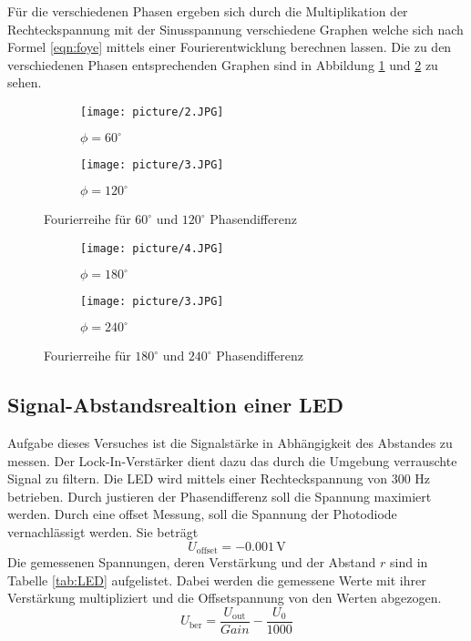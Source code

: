 Für die verschiedenen Phasen ergeben sich durch die Multiplikation der Rechteckspannung mit der Sinusspannung verschiedene Graphen welche sich nach Formel \ref{eqn:foye} mittels einer Fourierentwicklung berechnen lassen. Die zu den verschiedenen Phasen entsprechenden Graphen sind in Abbildung \ref{fig:graph1} und \ref{fig:graph2} zu sehen.

\begin{figure}
  \centering
  \begin{subfigure}{0.48\textwidth}
    \centering
    \texttt{[image: picture/2.JPG]}
    \caption{$\phi = 60^{\circ}$}
  \end{subfigure}
  \begin{subfigure}{0.48\textwidth}
    \centering
    \texttt{[image: picture/3.JPG]}
    \caption{$\phi = 120^{\circ}$}
  \end{subfigure}
  \caption{Fourierreihe für $60^{\circ}$ und $120^{\circ}$ Phasendifferenz}
  \label{fig:graph1}
\end{figure}
\begin{figure}
  \centering
  \begin{subfigure}{0.48\textwidth}
    \centering
    \texttt{[image: picture/4.JPG]}
    \caption{$\phi = 180^{\circ}$}
  \end{subfigure}
  \begin{subfigure}{0.48\textwidth}
    \centering
    \texttt{[image: picture/3.JPG]}
    \caption{$\phi = 240^{\circ}$}
  \end{subfigure}
  \caption{Fourierreihe für $180^{\circ}$ und $240^\circ$ Phasendifferenz}
  \label{fig:graph2}
\end{figure}


\subsection{Signal-Abstandsrealtion einer LED}
Aufgabe dieses Versuches ist die Signalstärke in Abhängigkeit des Abstandes zu messen. Der Lock-In-Verstärker dient dazu das durch die Umgebung verrauschte Signal zu filtern. Die LED wird mittels einer Rechteckspannung von 300 Hz betrieben. Durch justieren der Phasendifferenz soll die Spannung maximiert werden. Durch eine offset Messung, soll die Spannung der Photodiode vernachlässigt werden. Sie beträgt
\begin{equation}
  U_\text{offset}= -0.001 \, \text{V}
  \label{eqn:Uoffset}
\end{equation}
Die gemessenen Spannungen, deren Verstärkung und der Abstand $r$ sind in Tabelle \ref{tab:LED} aufgelistet. Dabei werden die gemessene Werte mit ihrer Verstärkung multipliziert und  die Offsetspannung von den Werten abgezogen.
\begin{equation}
  U_{\text{ber}} = \frac{U_{\text{out}}}{Gain} - \frac{U_{0}}{1000}
  \label{eqn:Uber}
\end{equation}

